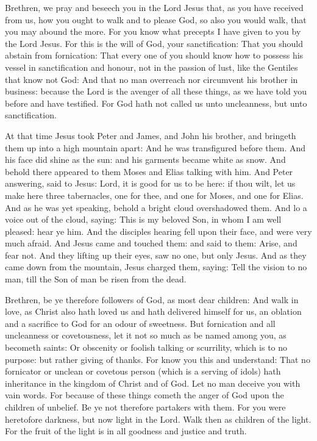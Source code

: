 \bigskip




Brethren, we pray and beseech you in the Lord Jesus that,
as you have received from us, how you ought to walk and to please God, so also
you would walk, that you may abound the more.  For you know what precepts I
have given to you by the Lord Jesus.  For this is the will of God, your
sanctification: That you should abstain from fornication: That every one of you
should know how to possess his vessel in sanctification and honour, not in the
passion of lust, like the Gentiles that know not God: And that no man overreach
nor circumvent his brother in business: because the Lord is the avenger of all
these things, as we have told you before and have testified.  For God hath not
called us unto uncleanness, but unto sanctification.



At that time Jesus took Peter and James, and John his brother,
and bringeth them up into a high mountain apart: And he was transfigured before
them. And his face did shine as the sun: and his garments became white as snow.
And behold there appeared to them Moses and Elias talking with him.  And Peter
answering, said to Jesus: Lord, it is good for us to be here: if thou wilt, let
us make here three tabernacles, one for thee, and one for Moses, and one for
Elias.  And as he was yet speaking, behold a bright cloud overshadowed them.
And lo a voice out of the cloud, saying: This is my beloved Son, in whom I am
well pleased: hear ye him.  And the disciples hearing fell upon their face, and
were very much afraid.  And Jesus came and touched them: and said to them:
Arise, and fear not.  And they lifting up their eyes, saw no one, but only
Jesus.  And as they came down from the mountain, Jesus charged them, saying:
Tell the vision to no man, till the Son of man be risen from the dead.



\bigskip



Brethren, be ye therefore followers of God, as most dear children: And walk in love, as
Christ also hath loved us and hath delivered himself for us, an oblation and a
sacrifice to God for an odour of sweetness.  But fornication and all
uncleanness or covetousness, let it not so much as be named among you, as
becometh saints: Or obscenity or foolish talking or scurrility, which is to no
purpose: but rather giving of thanks.  For know you this and understand: That
no fornicator or unclean or covetous person (which is a serving of idols) hath
inheritance in the kingdom of Christ and of God.  Let no man deceive you with
vain words. For because of these things cometh the anger of God upon the
children of unbelief.  Be ye not therefore partakers with them.  For you were
heretofore darkness, but now light in the Lord.  Walk then as children of the
light.  For the fruit of the light is in all goodness and justice and truth.


